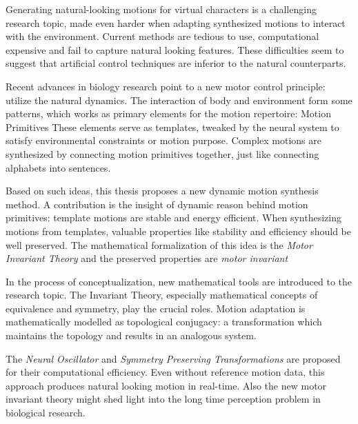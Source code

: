 


\begin{abstracts}        %

Generating natural-looking motions for virtual characters is a challenging research topic, made even harder when adapting synthesized motions to interact with the environment. 
Current methods are tedious to use, computational expensive and fail to capture natural looking features.
These difficulties seem to suggest that artificial control techniques are inferior to the natural counterparts.

Recent advances in biology research point to a new motor control principle: utilize the natural dynamics.
The interaction of body and environment form some patterns, which works as primary elements for the motion repertoire: Motion Primitives
These elements serve as templates, tweaked by the neural system to satisfy  environmental constraints or motion purpose.
Complex motions are synthesized by connecting motion primitives together, just like connecting alphabets into sentences.



Based on such ideas,   this thesis proposes a new dynamic motion synthesis method.
A contribution is the insight of dynamic reason behind motion primitives: template motions are stable and energy efficient. 
When synthesizing motions from templates, valuable properties  like stability and efficiency should be well preserved.
The mathematical formalization of this idea is the \emph{Motor Invariant Theory} and the preserved properties are \emph{motor invariant}

In the process of conceptualization, new mathematical tools are introduced to the research topic.
The Invariant Theory, especially mathematical concepts of equivalence and symmetry, play the crucial roles.
Motion adaptation is mathematically modelled as topological conjugacy: a transformation which maintains the topology and results in an analogous system.

The \emph{Neural Oscillator} and \emph{Symmetry Preserving Transformations} are proposed for their computational efficiency.
Even without reference motion data, this approach produces natural looking motion in real-time.
Also the new motor invariant theory might  shed light into the long time perception problem in biological research.

\end{abstracts}





